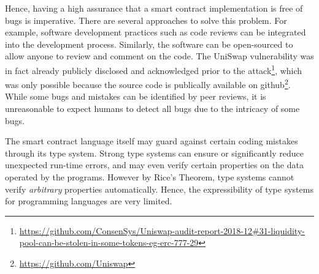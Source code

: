 \documentclass[twoside,11pt,openright]{report}
\begin{document}
Hence, having a high assurance that a smart contract implementation is free of bugs is imperative. There are several approaches to solve this problem. For example, software development practices such as code reviews can be integrated into the development process. Similarly, the software can be open-sourced to allow anyone to review and comment on the code. The UniSwap vulnerability was in fact already publicly disclosed and acknowledged prior to the attack\footnote{\url{https://github.com/ConsenSys/Uniswap-audit-report-2018-12\#31-liquidity-pool-can-be-stolen-in-some-tokens-eg-erc-777-29}}, which was only possible because the source code is publically available on github\footnote{\url{https://github.com/Uniswap}}. While some bugs and mistakes can be identified by peer reviews, it is unreasonable to expect humans to detect all bugs due to the intricacy of some bugs. 

The smart contract language itself may guard against certain coding mistakes through its type system. Strong type systems can ensure or significantly reduce unexpected run-time errors, and may even verify certain properties on the data operated by the programs. However by Rice's Theorem, type systems cannot verify \textit{arbitrary} properties automatically. Hence, the expressibility of type systems for programming languages are very limited.
\end{document}
